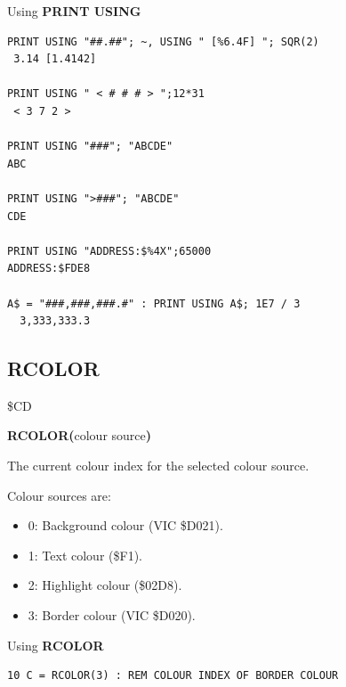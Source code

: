 \begin{description}[leftmargin=2cm,style=nextline]
\newpage
\item [Examples:] Using {\bf PRINT USING}

\begin{tcolorbox}[colback=black,coltext=white]
\verbatimfont{\codefont}
\begin{verbatim}
PRINT USING "##.##"; ~, USING " [%6.4F] "; SQR(2)
 3.14 [1.4142]

PRINT USING " < # # # > ";12*31
 < 3 7 2 >

PRINT USING "###"; "ABCDE"
ABC

PRINT USING ">###"; "ABCDE"
CDE

PRINT USING "ADDRESS:$%4X";65000
ADDRESS:$FDE8

A$ = "###,###,###.#" : PRINT USING A$; 1E7 / 3
  3,333,333.3
\end{verbatim}
\end{tcolorbox}
\end{description}


\newpage
\subsection{RCOLOR}
\begin{description}[leftmargin=2cm,style=nextline]
\item [Token:]    \$CD

\item [Format:]   {\bf RCOLOR(}colour source{\bf)}

\item [Returns:]  The current colour index for the selected colour source.

                  Colour sources are:
                  \begin{itemize}
                     \item 0: Background colour (VIC \$D021).
                     \item 1: Text colour (\$F1).
                     \item 2: Highlight colour (\$02D8).
                     \item 3: Border colour (VIC \$D020).
                  \end{itemize}

\item [Example:]  Using {\bf RCOLOR}

\begin{tcolorbox}[colback=black,coltext=white]
\verbatimfont{\codefont}
\begin{verbatim}
10 C = RCOLOR(3) : REM COLOUR INDEX OF BORDER COLOUR
\end{verbatim}
\end{tcolorbox}
\end{description}

